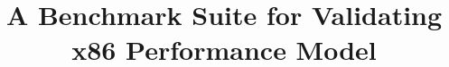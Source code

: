 \documentclass[conference]{IEEEtran}
\begin{document}
\title{A Benchmark Suite for Validating x86 Performance Model\\
}


\maketitle











\vspace{12pt}
\end{document}
